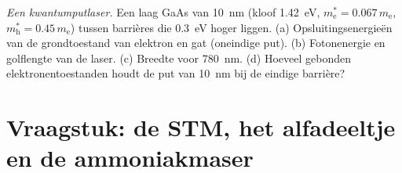 \begin{exercise}[$\star\star\star$]\label{exo:b2:potential-wells-tunneling:12}
\emph{Een kwantumputlaser.} Een laag GaAs van \qty{10}{nm} (kloof
\qty{1.42}{eV}, $m_{\text{e}}^* = 0.067\,m_{\text{e}}$,
$m_{\text{h}}^* = 0.45\,m_{\text{e}}$)
tussen barrières die \qty{0.3}{eV} hoger liggen. (a) Opsluitingsenergieën
van de grondtoestand
van elektron en gat (oneindige put). (b) Fotonenergie en golflengte
van de laser. (c) Breedte voor \qty{780}{nm}. (d) Hoeveel gebonden
elektronentoestanden
houdt de put van \qty{10}{nm} bij de eindige barrière?
\end{exercise}

\section{Vraagstuk: de STM, het alfadeeltje en de ammoniakmaser}

